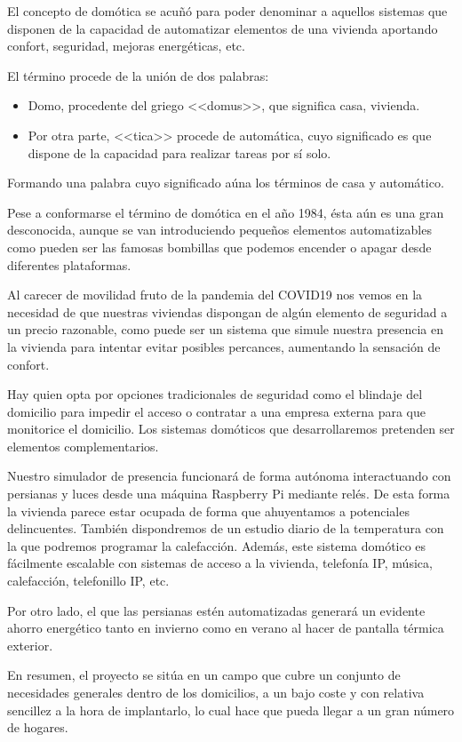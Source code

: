 
El concepto de domótica se acuñó para poder denominar a aquellos sistemas que disponen de la capacidad de automatizar elementos de una vivienda aportando confort, seguridad, mejoras energéticas, etc.

El término procede de la unión de dos palabras:

\begin{itemize}
    \item Domo, procedente del griego <<domus>>, que significa casa, vivienda.
    \item Por otra parte, <<tica>> procede de automática, cuyo significado es que dispone de la capacidad para realizar tareas por sí solo.
\end{itemize}

Formando una palabra cuyo significado aúna los términos de casa y automático.

Pese a conformarse el término de domótica en el año 1984, ésta aún es una gran desconocida, aunque se van introduciendo pequeños elementos automatizables como pueden ser las famosas bombillas que podemos encender o apagar desde diferentes plataformas.

Al carecer de movilidad fruto de la pandemia del COVID19 nos vemos en la necesidad de que nuestras viviendas dispongan de algún elemento de seguridad a un precio razonable, como puede ser un sistema que simule nuestra presencia en la vivienda para intentar evitar posibles percances, aumentando la sensación de confort.

Hay quien opta por opciones tradicionales de seguridad como el blindaje del domicilio para impedir el acceso o contratar a una empresa externa para que monitorice el domicilio. Los sistemas domóticos que desarrollaremos pretenden ser elementos complementarios.

Nuestro simulador de presencia funcionará de forma autónoma interactuando con persianas y luces desde una máquina Raspberry Pi mediante relés. De esta forma la vivienda parece estar ocupada de forma que ahuyentamos a potenciales delincuentes. También dispondremos de un estudio diario de la temperatura con la que podremos programar la calefacción. Además, este sistema domótico es fácilmente escalable con sistemas de acceso a la vivienda, telefonía IP, música, calefacción, telefonillo IP, etc.

Por otro lado, el que las persianas estén automatizadas generará un evidente ahorro energético tanto en invierno como en verano al hacer de pantalla térmica exterior.

En resumen, el proyecto se sitúa en un campo que cubre un conjunto de necesidades generales dentro de los domicilios, a un bajo coste y con relativa sencillez a la hora de implantarlo, lo cual hace que pueda llegar a un gran número de hogares.
